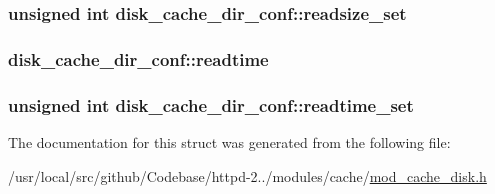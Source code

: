 \subsubsection[{\texorpdfstring{readsize\+\_\+set}{readsize_set}}]{\setlength{\rightskip}{0pt plus 5cm}unsigned {\bf int} disk\+\_\+cache\+\_\+dir\+\_\+conf\+::readsize\+\_\+set}\hypertarget{structdisk__cache__dir__conf_a82e2aa2a938f70d769dc9cdc8191e23d}{}\label{structdisk__cache__dir__conf_a82e2aa2a938f70d769dc9cdc8191e23d}
\subsubsection[{\texorpdfstring{readtime}{readtime}}]{ disk\+\_\+cache\+\_\+dir\+\_\+conf\+::readtime}\hypertarget{structdisk__cache__dir__conf_ac61894653954150478562046d248b9a2}{}\label{structdisk__cache__dir__conf_ac61894653954150478562046d248b9a2}
\subsubsection[{\texorpdfstring{readtime\+\_\+set}{readtime_set}}]{\setlength{\rightskip}{0pt plus 5cm}unsigned {\bf int} disk\+\_\+cache\+\_\+dir\+\_\+conf\+::readtime\+\_\+set}\hypertarget{structdisk__cache__dir__conf_a64efbdd1014c542c8755d55193edddd6}{}\label{structdisk__cache__dir__conf_a64efbdd1014c542c8755d55193edddd6}


The documentation for this struct was generated from the following file\+:\begin{DoxyCompactItemize}
\item 
/usr/local/src/github/\+Codebase/httpd-\/2../modules/cache/\hyperlink{mod__cache__disk_8h}{mod\+\_\+cache\+\_\+disk.\+h}\end{DoxyCompactItemize}
